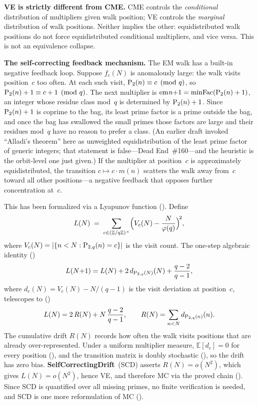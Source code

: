 \medskip
\noindent\textbf{VE is strictly different from CME.}\enspace
CME controls the \emph{conditional} distribution of multipliers given
walk position; VE controls the \emph{marginal} distribution of walk
positions.  Neither implies the other: equidistributed walk positions
do not force equidistributed conditional multipliers, and vice versa.
This is not an equivalence collapse.

\medskip
\noindent\textbf{The self-correcting feedback mechanism.}\enspace
The EM walk has a built-in negative feedback loop.  Suppose $f_c(N)$
is anomalously large: the walk visits position~$c$ too often.
At each such visit, $\mathrm{P}_{2}(n) \equiv c \pmod{q}$, so
$\mathrm{P}_{2}(n) + 1 \equiv c + 1 \pmod{q}$.  The next multiplier is
$\mathrm{em}_{}{n{+}1} = \mathrm{minFac}(\mathrm{P}_{2}(n) + 1)$, an integer whose residue
class mod~$q$ is determined by $\mathrm{P}_{2}(n) + 1$.  Since $\mathrm{P}_{2}(n)+1$
is coprime to the bag, its least prime factor is a prime outside the
bag, and once the bag has swallowed the small primes those factors are
large and their residues mod~$q$ have no reason to prefer a class.
(An earlier draft invoked ``Alladi's theorem'' here as unweighted
equidistribution of the least prime factor of generic integers; that
statement is false---Dead End~\#160---and the heuristic is the
orbit-level one just given.)  If the multiplier at position~$c$ is
approximately equidistributed, the transition $c \mapsto c \cdot m(n)$ scatters the
walk away from~$c$ toward all other positions---a negative feedback
that opposes further concentration at~$c$.

This has been formalized via a Lyapunov function
().  Define
\[
  L(N) \;=\; \sum_{c \in (\mathbb{Z}/q\mathbb{Z})^\times}
  \Bigl(V_c(N) - \frac{N}{\varphi(q)}\Bigr)^{\!2},
\]
where $V_c(N) = |\{n < N : \mathrm{P}_{2,q}(n) = c\}|$ is the visit count.
The one-step algebraic identity
()
\[
  L(N{+}1) = L(N) + 2\,d_{\mathrm{P}_{2,q}(N)}(N) + \frac{q-2}{q-1},
\]
where $d_c(N) = V_c(N) - N/(q{-}1)$ is the visit deviation at
position~$c$, telescopes to
()
\[
  L(N) = 2\,R(N) + N\,\frac{q-2}{q-1},
  \qquad R(N) = \sum_{n<N} d_{\mathrm{P}_{2,q}(n)}(n).
\]
The cumulative drift $R(N)$ records how often the walk visits
positions that are already over-represented.  Under a uniform
multiplier measure, $\mathbb{E}[d_c] = 0$ for every position
(),
and the transition matrix is doubly stochastic
(),
so the drift has zero bias.
\textbf{SelfCorrectingDrift}~(SCD) asserts $R(N) = o(N^2)$, which
gives $L(N) = o(N^2)$, hence VE, and therefore MC via the proved
chain ().
Since SCD is quantified over all missing primes, no finite verification
is needed, and SCD is one more reformulation of MC
().

